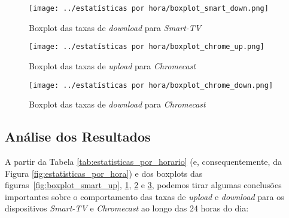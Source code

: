 \begin{figure}[H]
    \centering
    \texttt{[image: ../estatísticas por hora/boxplot\_smart\_down.png]}
    \caption{Boxplot das taxas de \textit{download} para \textit{Smart-TV}}
    \label{fig:boxplot_smart_down}
\end{figure}

\begin{figure}[H]
    \centering
    \texttt{[image: ../estatísticas por hora/boxplot\_chrome\_up.png]}
    \caption{Boxplot das taxas de \textit{upload} para \textit{Chromecast}}
    \label{fig:boxplot_chrome_up}
\end{figure}

\begin{figure}[H]
    \centering
    \texttt{[image: ../estatísticas por hora/boxplot\_chrome\_down.png]}
    \caption{Boxplot das taxas de \textit{download} para \textit{Chromecast}}
    \label{fig:boxplot_chrome_down}
\end{figure}

\subsection{Análise dos Resultados}
\label{sec:analise_resultados_horario}

A partir da Tabela \ref{tab:estatisticas_por_horario} (e, consequentemente, da Figura  \ref{fig:estatisticas_por_hora}) e dos boxplots das figuras~\ref{fig:boxplot_smart_up}, \ref{fig:boxplot_smart_down}, \ref{fig:boxplot_chrome_up} e \ref{fig:boxplot_chrome_down}, podemos tirar algumas conclusões importantes sobre o comportamento das taxas de \textit{upload} e \textit{download} para os dispositivos \textit{Smart-TV} e \textit{Chromecast} ao longo das 24 horas do dia:

